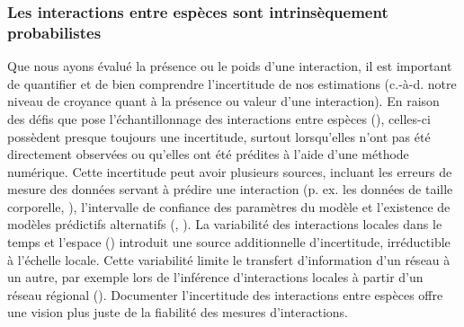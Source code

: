 \subsubsection{Les interactions entre espèces sont intrinsèquement probabilistes} 

Que nous ayons évalué la présence ou le poids d'une interaction, il est
important de quantifier et de bien comprendre l'incertitude de nos estimations
(c.-à-d. notre niveau de croyance quant à la présence ou valeur d'une
interaction). En raison des défis que pose l'échantillonnage des interactions
entre espèces (\cite{Jordano2016Sampling}), celles-ci possèdent presque toujours
une incertitude, surtout lorsqu'elles n'ont pas été directement observées ou
qu'elles ont été prédites à l'aide d'une méthode numérique. Cette incertitude
peut avoir plusieurs sources, incluant les erreurs de mesure des données servant
à prédire une interaction (p. ex. les données de taille corporelle,
\cite{Gravel2013Inferring}), l'intervalle de confiance des paramètres du modèle
et l'existence de modèles prédictifs alternatifs (\cite{Simmonds2022Insights},
\cite{Simmonds2024Recommendations}). La variabilité des interactions locales
dans le temps et l'espace (\cite{Poisot2015Species}) introduit une source
additionnelle d'incertitude, irréductible à l'échelle locale. Cette variabilité
limite le transfert d'information d'un réseau à un autre, par exemple lors de
l'inférence d'interactions locales à partir d'un réseau régional
(\cite{Dansereau2024Spatially}). Documenter l'incertitude des interactions entre
espèces offre une vision plus juste de la fiabilité des mesures d'interactions.

